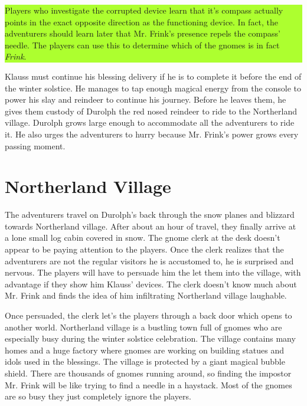 \documentclass{article}
\begin{document}
\begin{multicols*}{2}
	\colorbox{GreenYellow}{\begin{minipage}{0.4\textwidth}
		Players who investigate the corrupted device learn that it's compass actually points in the exact opposite direction as the functioning device. In fact, the adventurers should learn later that Mr. Frink's presence repels the compass' needle. The players can use this to determine which of the gnomes is in fact \emph{Frink}. 			
	\end{minipage}}
	\break
	
	Klauss must continue his blessing delivery if he is to complete it before the end of the winter solstice. He manages to tap enough magical energy from the console to power his slay and reindeer to continue his journey. Before he leaves them, he gives them custody of Durolph the red nosed reindeer to ride to the Northerland village. Durolph grows large enough to accommodate all the adventurers to ride it. He also urges the adventurers to hurry because Mr. Frink's power grows every passing moment. 
	
	\section{Northerland Village}

	The adventurers travel on Durolph's back through the snow planes and blizzard towards Northerland village. After about an hour of travel, they finally arrive at a lone small log cabin covered in snow. The gnome clerk at the desk doesn't appear to be paying attention to the players. Once the clerk realizes that the adventurers are not the regular visitors he is accustomed to, he is surprised and nervous. The players will have to persuade him the let them into the village, with advantage if they show him Klauss' devices. The clerk doesn't know much about Mr. Frink and finds the idea of him infiltrating Northerland village laughable.
	
	Once persuaded, the clerk let's the players through a back door which opens to another world. Northerland village is a bustling town full of gnomes who are especially busy during the winter solstice celebration. The village contains many homes and a huge factory where gnomes are working on building statues and idols used in the blessings. The village is protected by a giant magical bubble shield. There are thousands of gnomes running around, so finding the impostor Mr. Frink will be like trying to find a needle in a haystack. Most of the gnomes are so busy they just completely ignore the players.
	

\end{multicols*}
\end{document}
